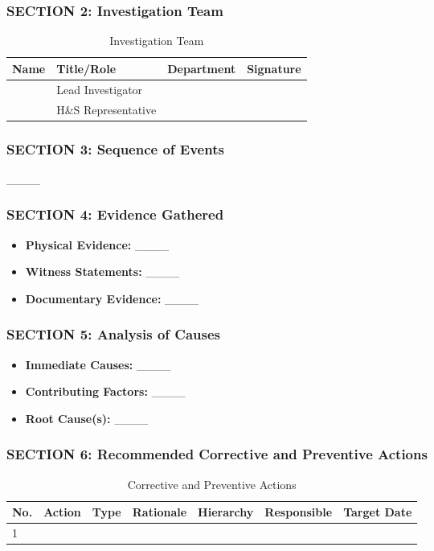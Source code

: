 \documentclass[11pt]{article}
\begin{document}
\subsubsection*{SECTION 2: Investigation Team}
\begin{table}[h]
    \centering
    \begin{tabular}{p{3cm}p{3cm}p{3cm}p{3cm}}
        \toprule
        \textbf{Name} & \textbf{Title/Role} & \textbf{Department} & \textbf{Signature} \\
        \midrule
        & Lead Investigator & & \\
        & H\&S Representative & & \\
        \bottomrule
    \end{tabular}
    \caption{Investigation Team}
\end{table}

\subsubsection*{SECTION 3: Sequence of Events}
\_\_\_\_

\subsubsection*{SECTION 4: Evidence Gathered}
\begin{itemize}
    \item \textbf{Physical Evidence:} \_\_\_\_
    \item \textbf{Witness Statements:} \_\_\_\_
    \item \textbf{Documentary Evidence:} \_\_\_\_
\end{itemize}

\subsubsection*{SECTION 5: Analysis of Causes}
\begin{itemize}
    \item \textbf{Immediate Causes:} \_\_\_\_
    \item \textbf{Contributing Factors:} \_\_\_\_
    \item \textbf{Root Cause(s):} \_\_\_\_
\end{itemize}

\subsubsection*{SECTION 6: Recommended Corrective and Preventive Actions}
\begin{table}[h]
    \centering
    \begin{tabular}{p{1cm}p{3cm}p{2cm}p{3cm}p{2cm}p{2cm}p{2cm}}
        \toprule
        \textbf{No.} & \textbf{Action} & \textbf{Type} & \textbf{Rationale} & \textbf{Hierarchy} & \textbf{Responsible} & \textbf{Target Date} \\
        \midrule
        1 & & & & & & \\
        \bottomrule
    \end{tabular}
    \caption{Corrective and Preventive Actions}
\end{table}
\end{document}
